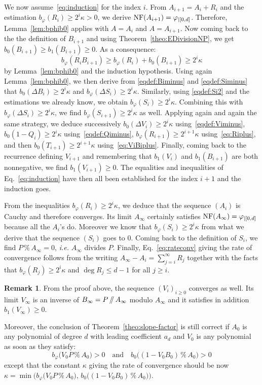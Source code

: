 \documentclass{sig-alternate-05-2015}
\newcommand{\NF}{\text{\rm NF}}
\renewcommand{\mod}{\,\%\,}
\renewcommand{\div}{\,/\hspace{-0.3em}/\,}
\theoremstyle{definition}
\newtheorem{rem}[theo]{Remark}
\begin{document}
We now assume~\eqref{eq:induction} for the index $i$.
From $A_{i+1} = A_i + R_i$ and the estimation $b_\varphi(R_i) \geq 2^i 
\kappa > 0$, we derive $\NF(A_{i+1}) = \varphi_{|[0,d]}$. Therefore,
Lemma~\ref{lem:bphib0} applies with $A = A_i$ and $A = A_{i+1}$.
Now coming back to the the definition of $B_{i+1}$ and using
Theorem~\ref{theo:EDivisionNP}, we get $b_0(B_{i+1}) \geq b_1(B_{i+1}) 
\geq 0$. As a consequence:
$$b_\varphi(R_i B_{i+1}) \geq b_\varphi(R_i) + b_0(B_{i+1})
\geq 2^i \kappa$$
by Lemma~\ref{lem:bphib0} and the induction hypothesis.
Using again Lemma~\ref{lem:bphib0}, we then derive from 
\eqref{eqdef:Biminus} and \eqref{eqdef:Siminus} that $b_0(\Delta B_i) \geq 
2^i \kappa$ and $b_\varphi(\Delta S_i) \geq 2^i \kappa$.
Similarly, using \eqref{eqdef:Si2} and the estimations we already know,
we obtain $b_\varphi(S_i) \geq 2^i \kappa$. Combining this with
$b_\varphi(\Delta S_i) \geq 2^i \kappa$, we find
$b_\varphi(S_{i+1}) \geq 2^i \kappa$ as well. Applying again and again
the same strategy, we deduce successively
$b_0(\Delta V_i) \geq 2^i \kappa$ using~\eqref{eqdef:Viminus},
$b_0(1{-}Q_i) \geq 2^i \kappa$ using~\eqref{eqdef:Qiminus},
$b_\varphi(R_{i+1}) \geq 2^{i+1} \kappa$ using~\eqref{eq:Riplus},
and then $b_0(T_{i+1}) \geq 2^{i+1} \kappa$
using~\eqref{eq:ViBiplus}. Finally, coming back to the recurrence
defining $V_{i+1}$ and remembering that $b_1(V_i)$ and $b_1(B_{i+1})$
are both nonnegative, we find $b_1(V_{i+1}) \geq 0$.
The equalities and inequalities
of Eq.~\eqref{eq:induction} have then all been established for
the index $i+1$ and the induction goes.

From the inequalities $b_\varphi(R_i) \geq 2^i \kappa$, we deduce that 
the sequence $(A_i)$ is Cauchy and therefore converges. Its limit 
$A_\infty$ certainly satisfies $\NF(A_\infty) = \varphi_{|[0,d]}$ because 
all the $A_i$'s do. Moreover we know that $b_\varphi(S_i) \geq 2^i 
\kappa$ from what we derive that the sequence $(S_i)$ goes to $0$.
Coming back to the definition of $S_i$, we find $P \mod A_\infty = 0$,
\emph{i.e.} $A_\infty$ divides $P$. Finally, Eq.~\eqref{eq:rateconv}
giving the rate of convergence follows from the writing
$A_\infty{-}A_i = \sum_{j=i}^\infty R_j$
together with the facts that $b_\varphi(R_j) \geq 2^i \kappa$ and $\deg 
R_j \leq d{-}1$ for all $j \geq i$.

\begin{rem}
\label{rem:slope-factor}
From the proof above, the sequence $(V_i)_{i \geq 0}$
converges as well. Its limit $V_\infty$ is an inverse of $B_\infty
= P \div A_\infty$ modulo $A_\infty$ and it satisfies in addition
$b_1(V_\infty) \geq 0$.

Moreover, the conclusion of 
Theorem~\ref{theo:slope-factor} is still correct if $A_0$ is any 
polynomial of degree $d$ with leading coefficient $a_d$ and $V_0$
is any polynomial as soon as they satisfy:
$$b_\varphi\big(V_0 P \mod A_0\big) > 0
\quad \text{and} \quad
b_0\big((1 - V_0 B_0) \mod A_0\big) > 0$$
except that the constant $\kappa$ giving the rate of convergence
should be now
$\kappa = \min \big( 
b_\varphi\big(V_0 P \mod A_0\big), \,
b_0\big((1 - V_0 B_0) \mod A_0\big)\big)$.
\end{rem}
\end{document}
